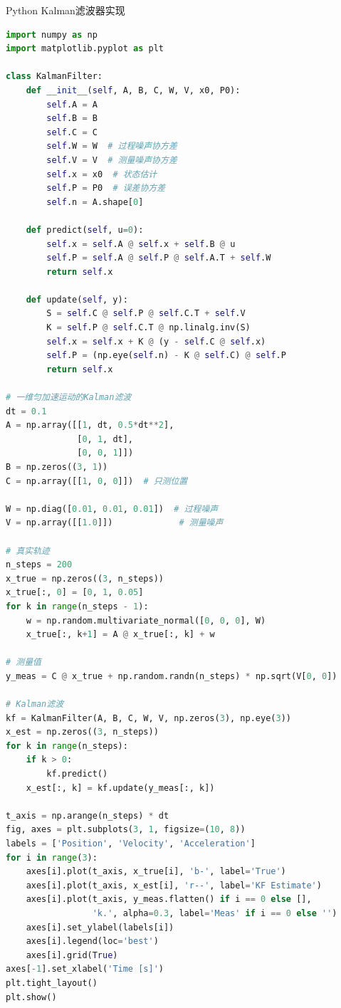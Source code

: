 \begin{mycode}{Python Kalman滤波器实现}
\begin{lstlisting}[language=Python]
import numpy as np
import matplotlib.pyplot as plt

class KalmanFilter:
    def __init__(self, A, B, C, W, V, x0, P0):
        self.A = A
        self.B = B
        self.C = C
        self.W = W  # 过程噪声协方差
        self.V = V  # 测量噪声协方差
        self.x = x0  # 状态估计
        self.P = P0  # 误差协方差
        self.n = A.shape[0]

    def predict(self, u=0):
        self.x = self.A @ self.x + self.B @ u
        self.P = self.A @ self.P @ self.A.T + self.W
        return self.x

    def update(self, y):
        S = self.C @ self.P @ self.C.T + self.V
        K = self.P @ self.C.T @ np.linalg.inv(S)
        self.x = self.x + K @ (y - self.C @ self.x)
        self.P = (np.eye(self.n) - K @ self.C) @ self.P
        return self.x

# 一维匀加速运动的Kalman滤波
dt = 0.1
A = np.array([[1, dt, 0.5*dt**2],
              [0, 1, dt],
              [0, 0, 1]])
B = np.zeros((3, 1))
C = np.array([[1, 0, 0]])  # 只测位置

W = np.diag([0.01, 0.01, 0.01])  # 过程噪声
V = np.array([[1.0]])             # 测量噪声

# 真实轨迹
n_steps = 200
x_true = np.zeros((3, n_steps))
x_true[:, 0] = [0, 1, 0.05]
for k in range(n_steps - 1):
    w = np.random.multivariate_normal([0, 0, 0], W)
    x_true[:, k+1] = A @ x_true[:, k] + w

# 测量值
y_meas = C @ x_true + np.random.randn(n_steps) * np.sqrt(V[0, 0])

# Kalman滤波
kf = KalmanFilter(A, B, C, W, V, np.zeros(3), np.eye(3))
x_est = np.zeros((3, n_steps))
for k in range(n_steps):
    if k > 0:
        kf.predict()
    x_est[:, k] = kf.update(y_meas[:, k])

t_axis = np.arange(n_steps) * dt
fig, axes = plt.subplots(3, 1, figsize=(10, 8))
labels = ['Position', 'Velocity', 'Acceleration']
for i in range(3):
    axes[i].plot(t_axis, x_true[i], 'b-', label='True')
    axes[i].plot(t_axis, x_est[i], 'r--', label='KF Estimate')
    axes[i].plot(t_axis, y_meas.flatten() if i == 0 else [],
                 'k.', alpha=0.3, label='Meas' if i == 0 else '')
    axes[i].set_ylabel(labels[i])
    axes[i].legend(loc='best')
    axes[i].grid(True)
axes[-1].set_xlabel('Time [s]')
plt.tight_layout()
plt.show()
\end{lstlisting}
\end{mycode}

